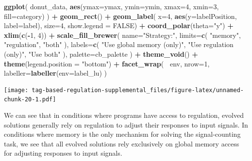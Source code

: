 \documentclass[]{book}
\newenvironment{Shaded}{\begin{snugshade}}{\end{snugshade}}
\newcommand{\DataTypeTok}[1]{\textcolor[rgb]{0.13,0.29,0.53}{#1}}
\newcommand{\DecValTok}[1]{\textcolor[rgb]{0.00,0.00,0.81}{#1}}
\newcommand{\KeywordTok}[1]{\textcolor[rgb]{0.13,0.29,0.53}{\textbf{#1}}}
\newcommand{\NormalTok}[1]{#1}
\newcommand{\OperatorTok}[1]{\textcolor[rgb]{0.81,0.36,0.00}{\textbf{#1}}}
\newcommand{\OtherTok}[1]{\textcolor[rgb]{0.56,0.35,0.01}{#1}}
\newcommand{\StringTok}[1]{\textcolor[rgb]{0.31,0.60,0.02}{#1}}
\begin{document}
\begin{Shaded}
\begin{Highlighting}[]
\KeywordTok{ggplot}\NormalTok{( donut_data, }\KeywordTok{aes}\NormalTok{(}\DataTypeTok{ymax=}\NormalTok{ymax, }\DataTypeTok{ymin=}\NormalTok{ymin, }\DataTypeTok{xmax=}\DecValTok{4}\NormalTok{, }\DataTypeTok{xmin=}\DecValTok{3}\NormalTok{, }\DataTypeTok{fill=}\NormalTok{category) ) }\OperatorTok{+}
\StringTok{  }\KeywordTok{geom_rect}\NormalTok{() }\OperatorTok{+}
\StringTok{  }\KeywordTok{geom_label}\NormalTok{( }\DataTypeTok{x=}\DecValTok{4}\NormalTok{, }\KeywordTok{aes}\NormalTok{(}\DataTypeTok{y=}\NormalTok{labelPosition, }\DataTypeTok{label=}\NormalTok{label), }\DataTypeTok{size=}\DecValTok{4}\NormalTok{, }\DataTypeTok{show.legend =} \OtherTok{FALSE}\NormalTok{) }\OperatorTok{+}
\StringTok{  }\KeywordTok{coord_polar}\NormalTok{(}\DataTypeTok{theta=}\StringTok{"y"}\NormalTok{) }\OperatorTok{+}
\StringTok{  }\KeywordTok{xlim}\NormalTok{(}\KeywordTok{c}\NormalTok{(}\OperatorTok{-}\DecValTok{1}\NormalTok{, }\DecValTok{4}\NormalTok{)) }\OperatorTok{+}
\StringTok{  }\KeywordTok{scale_fill_brewer}\NormalTok{(}
    \DataTypeTok{name=}\StringTok{"Strategy:"}\NormalTok{,}
    \DataTypeTok{limits=}\KeywordTok{c}\NormalTok{(}
      \StringTok{"memory"}\NormalTok{,}
      \StringTok{"regulation"}\NormalTok{,}
      \StringTok{"both"}
\NormalTok{    ),}
    \DataTypeTok{labels=}\KeywordTok{c}\NormalTok{(}
      \StringTok{"Use global memory (only)"}\NormalTok{,}
      \StringTok{"Use regulation (only)"}\NormalTok{,}
      \StringTok{"Use both"}
\NormalTok{    ),}
    \DataTypeTok{palette=}\NormalTok{cb_palette}
\NormalTok{  ) }\OperatorTok{+}
\StringTok{  }\KeywordTok{theme_void}\NormalTok{() }\OperatorTok{+}
\StringTok{  }\KeywordTok{theme}\NormalTok{(}\DataTypeTok{legend.position =} \StringTok{"bottom"}\NormalTok{) }\OperatorTok{+}
\StringTok{  }\KeywordTok{facet_wrap}\NormalTok{(}
    \OperatorTok{~}\NormalTok{env,}
    \DataTypeTok{nrow=}\DecValTok{1}\NormalTok{,}
    \DataTypeTok{labeller=}\KeywordTok{labeller}\NormalTok{(}\DataTypeTok{env=}\NormalTok{label_lu)}
\NormalTok{  )}
\end{Highlighting}
\end{Shaded}

\texttt{[image: tag-based-regulation-supplemental\_files/figure-latex/unnamed-chunk-20-1.pdf]}

We can see that in conditions where programs have access to regulation, evolved solutions generally rely on regulation to adjust their responses to input signals.
In conditions where memory is the only mechanism for solving the signal-counting task, we see that all evolved solutions rely exclusively on global memory access for adjusting responses to input signals.
\end{document}
